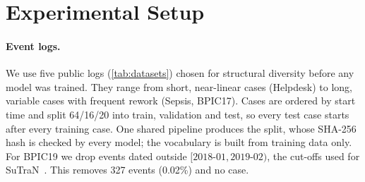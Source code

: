 \section{Experimental Setup}\label{sec:setup}

\paragraph{Event logs.}
We use five public logs (\cref{tab:datasets}) chosen for structural diversity
before any model was trained. They range from short, near-linear cases
(Helpdesk) to long, variable cases with frequent rework (Sepsis, BPIC17).
Cases are ordered by start time and split 64/16/20 into train, validation and
test, so every test case starts after every training case. One shared
pipeline produces the split, whose SHA-256 hash is checked by every model; the
vocabulary is built from training data only. For BPIC19 we drop events dated
outside $[2018\text{-}01, 2019\text{-}02)$, the cut-offs used for
SuTraN~\cite{wuyts2024sutran}. This removes 327 events (0.02\%) and no case.

\begin{table}[t]
\centering
\caption{Event logs after preprocessing (generated from the pipeline
manifests). $|\mathcal{A}|$: activities; $\bar T$/$\tilde T$: mean/median
trace length; $H_{\mathrm{var}}$: variant entropy (bits).
$^\dagger$After the date filter.}
\label{tab:datasets}
\scriptsize
\setlength{\tabcolsep}{3.2pt}

\end{table}

